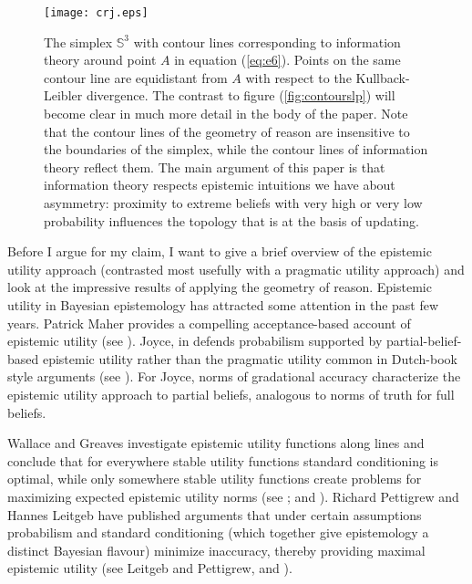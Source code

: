 \documentclass[11pt]{article}
\begin{document}
\begin{figure}[ht]
  \begin{flushright}
    \begin{minipage}[h]{.7\linewidth}
      \texttt{[image: crj.eps]}
      \caption{\footnotesize The simplex $\mathbb{S}^{3}$ with contour
        lines corresponding to information theory around point $A$ in
        equation (\ref{eq:e6}). Points on the same contour line are
        equidistant from $A$ with respect to the Kullback-Leibler
        divergence. The contrast to figure (\ref{fig:contourslp}) will
        become clear in much more detail in the body of the paper.
        Note that the contour lines of the geometry of reason are
        insensitive to the boundaries of the simplex, while the
        contour lines of information theory reflect them. The main
        argument of this paper is that information theory respects
        epistemic intuitions we have about asymmetry: proximity to
        extreme beliefs with very high or very low probability
        influences the topology that is at the basis of updating.}
      \label{fig:contoursrj}
    \end{minipage}
  \end{flushright}
\end{figure}

Before I argue for my claim, I want to give a brief overview of the
epistemic utility approach (contrasted most usefully with a pragmatic
utility approach) and look at the impressive results of applying the
geometry of reason. Epistemic utility in Bayesian epistemology has
attracted some attention in the past few years. Patrick Maher provides
a compelling acceptance-based account of epistemic utility (see
). Joyce, in  defends probabilism supported by
partial-belief-based epistemic utility rather than the pragmatic
utility common in Dutch-book style arguments (see
). For Joyce, norms of gradational accuracy
characterize the epistemic utility approach to partial beliefs,
analogous to norms of truth for full beliefs.

Wallace and Greaves investigate epistemic utility functions along
 lines and conclude that for everywhere stable
utility functions standard conditioning is optimal, while only
somewhere stable utility functions create problems for maximizing
expected epistemic utility norms (see ;
and ). Richard Pettigrew and Hannes Leitgeb
have published arguments that under certain assumptions probabilism
and standard conditioning (which together give epistemology a distinct
Bayesian flavour) minimize inaccuracy, thereby providing maximal
epistemic utility (see Leitgeb and Pettigrew,
 and
).
\end{document}
